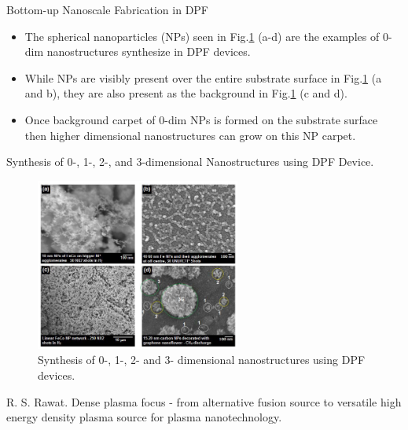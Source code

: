 \begin{frame} {Bottom-up Nanoscale Fabrication in DPF}
    \begin{itemize}
        \item The spherical nanoparticles (NPs) seen in Fig.\ref{fig:synthesis-of-nanostructures} (a-d) are the examples of 0-dim nanostructures synthesize in DPF devices.
        \item While NPs are visibly present over the entire substrate surface in Fig.\ref{fig:synthesis-of-nanostructures} (a and b), they are also present as the background in Fig.\ref{fig:synthesis-of-nanostructures} (c and d).
        \item Once background carpet of 0-dim NPs is formed on the substrate surface then higher dimensional nanostructures can grow on this NP carpet.
    \end{itemize}
\end{frame}

\begin{frame} {Synthesis of 0-, 1-, 2-, and 3-dimensional Nanostructures using DPF Device.}
    \begin{figure}
        \centering
        \includegraphics[width=0.6\textwidth]{figures/synthesis-of-0-1-2-3-dimensional-nanostructures.png}
        \caption{\scriptsize Synthesis of 0-, 1-, 2- and 3- dimensional nanostructures using DPF devices. \cite{rawat_2015_dense}}
        \label{fig:synthesis-of-nanostructures}
    \end{figure}
    \tiny{\cite{rawat_2015_dense} R. S. Rawat. Dense plasma focus - from alternative fusion source to versatile high energy density plasma source for plasma nanotechnology.}
\end{frame}